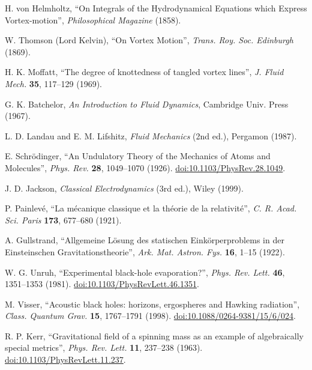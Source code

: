 \documentclass[11pt,a4paper]{article}
\begin{document}
    \begin{thebibliography}{99}

        H. von Helmholtz, ``On Integrals of the Hydrodynamical Equations which Express Vortex-motion'',
        \emph{Philosophical Magazine} (1858).

        W. Thomson (Lord Kelvin), ``On Vortex Motion'',
        \emph{Trans. Roy. Soc. Edinburgh} (1869).

        H. K. Moffatt, ``The degree of knottedness of tangled vortex lines'',
        \emph{J. Fluid Mech.} \textbf{35}, 117–129 (1969).

        G. K. Batchelor, \emph{An Introduction to Fluid Dynamics}, Cambridge Univ. Press (1967).

        L. D. Landau and E. M. Lifshitz, \emph{Fluid Mechanics} (2nd ed.), Pergamon (1987).

        E. Schr\"odinger, ``An Undulatory Theory of the Mechanics of Atoms and Molecules'',
        \emph{Phys. Rev.} \textbf{28}, 1049–1070 (1926). \href{https://doi.org/10.1103/PhysRev.28.1049}{doi:10.1103/PhysRev.28.1049}.

        J. D. Jackson, \emph{Classical Electrodynamics} (3rd ed.), Wiley (1999).

        P. Painlev\'e, ``La m\'ecanique classique et la th\'eorie de la relativit\'e'',
        \emph{C. R. Acad. Sci. Paris} \textbf{173}, 677–680 (1921).

        A. Gullstrand, ``Allgemeine L\"osung des statischen Eink\"orperproblems in der Einsteinschen Gravitationstheorie'',
        \emph{Ark. Mat. Astron. Fys.} \textbf{16}, 1–15 (1922).

        W. G. Unruh, ``Experimental black-hole evaporation?'',
        \emph{Phys. Rev. Lett.} \textbf{46}, 1351–1353 (1981).
        \href{https://doi.org/10.1103/PhysRevLett.46.1351}{doi:10.1103/PhysRevLett.46.1351}.

        M. Visser, ``Acoustic black holes: horizons, ergospheres and Hawking radiation'',
        \emph{Class. Quantum Grav.} \textbf{15}, 1767–1791 (1998).
        \href{https://doi.org/10.1088/0264-9381/15/6/024}{doi:10.1088/0264-9381/15/6/024}.

        R. P. Kerr, ``Gravitational field of a spinning mass as an example of algebraically special metrics'',
        \emph{Phys. Rev. Lett.} \textbf{11}, 237–238 (1963).
        \href{https://doi.org/10.1103/PhysRevLett.11.237}{doi:10.1103/PhysRevLett.11.237}.
    \end{thebibliography}
\end{document}
